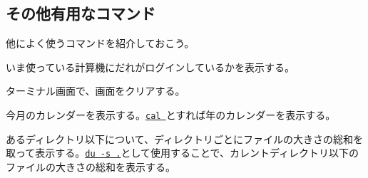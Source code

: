 \subsection{その他有用なコマンド}
他によく使うコマンドを紹介しておこう。
\begin{itemize}

          いま使っている計算機にだれがログインしているかを表示する。


          ターミナル画面で、画面をクリアする。


          今月のカレンダーを表示する。\underline{\texttt{cal \nendo}}とすれば{\nendo}年のカレンダーを表示する。


          あるディレクトリ以下について、ディレクトリごとにファイルの大きさの総和を取って表示する。\underline{\texttt{du -s .}}として使用することで、カレントディレクトリ以下のファイルの大きさの総和を表示する。

    \label{sect: tar}


\end{itemize}
